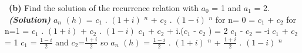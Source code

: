 \documentclass[a4 paper]{article}
\numberwithin{equation}{section}
\newcommand{\subproblem}[1]{~\newline\textbf{(#1)}}
\newcommand{\solution}{~\newline\textbf{\textit{(Solution)}} }
\newcommand{\0}{\mathbf{0}}
\begin{document}
\subproblem{b} Find the solution of the recurrence relation with $a_0$ = 1 and $a_1$ = 2.\\
\solution
\newline
$a_{n}$ $(h)$ = $c_1$ . $(1+i)$ $^n$ + $c_2$ . $(1-i)$ $^n$  \newline
for n= 0  =  $c_1$ +  $c_2$ \newline
for n=1  = $c_1$ . $(1+i)$ +  $c_2$ . $(1-i)$ \newline
$c_1$ + $c_2$ + i.($c_1$ - $c_2$ ) = 2 \newline
$c_1$ - $c_2$ = -i \newline
$c_1$ + $c_2$ = 1 \newline \newline
$c_1$ = $\frac{1-i}{2}$ and  $c_2$=$\frac{1+i}{2}$ so \newline \newline
$a_{n}$ $(h)$ = $\frac{1-i}{2}$ . $(1+i)$ $^n$ + $\frac{1+i}{2}$ . $(1-i)$ $^n$  \newline
\end{document}
